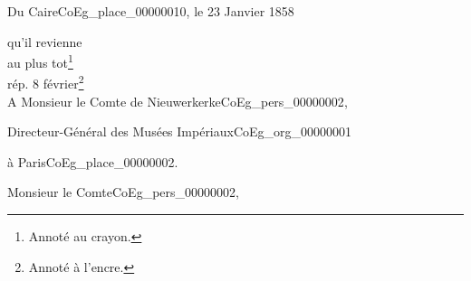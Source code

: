\documentclass{book}
\begin{document}
\begin{flushright} Du Caire\gls{CoEg_place_00000010}, le 23 Janvier 1858\end{flushright}
\noindent qu'il revienne\\
au plus tot\footnote{Annoté au crayon.}\\
\noindent rép. 8 février\footnote{Annoté à l'encre.}\\

\indent A Monsieur le Comte de Nieuwerkerke\gls{CoEg_pers_00000002},
\begin{center}Directeur-Général des Musées Impériaux\gls{CoEg_org_00000001}\end{center}
\begin{flushright}à Paris\gls{CoEg_place_00000002}.\end{flushright}

\hspace{1cm} Monsieur le Comte\gls{CoEg_pers_00000002},\\
\end{document}
